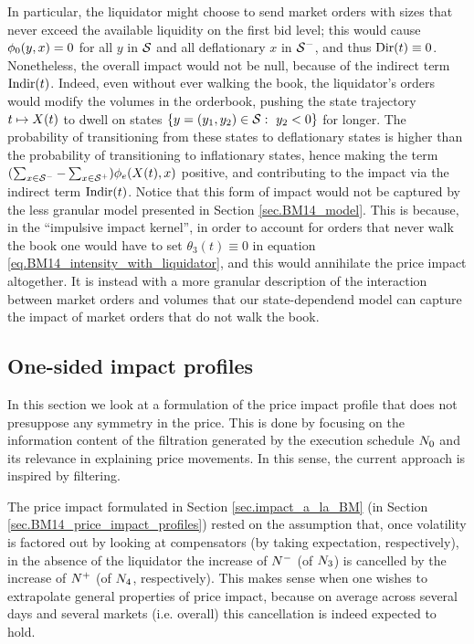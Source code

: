 \documentclass[10pt]{article}
\begin{document}
 In particular, the liquidator might choose to send market orders with sizes that never exceed the available liquidity on the first bid level; this would cause $\transProb_0(y,x)=0$ for all $y$ in $\stateSpace$ and all deflationary $x$ in $\deflationarySpace$, and thus $\directImpact(t)\equiv 0$. Nonetheless, the overall impact would not be null, because of the indirect term $\indirectImpact(t)$. Indeed, even without ever walking the book, the liquidator's orders would modify the volumes in the orderbook, pushing the state trajectory $t\mapsto \stateVariable(t)$ to dwell on states $\lbrace y=(y_1,y_2)\in\stateSpace: \, \, y_2<0\rbrace$ for longer. The probability of transitioning from these states to deflationary states is higher than the probability of transitioning to inflationary states, hence making the term $(\sum_{x\in\deflationarySpace} - \sum_{x\in\inflationarySpace})\transProb_{e}(\stateVariable(t), x)$ positive, and contributing to the impact via the indirect term $\indirectImpact(t)$.
 Notice that this form of impact would not be captured by the less granular model presented in Section \ref{sec.BM14_model}. This is because, in the ``impulsive impact kernel'', in order to account for orders that never walk the book one would have to set $\theta_3(t)\equiv0$ in equation \eqref{eq.BM14_intensity_with_liquidator}, and this would annihilate the price impact altogether.  It is instead with a more granular description of the interaction between market orders and volumes that our state-dependend model can capture the impact of market orders that do not walk the book.   

\subsection{One-sided impact profiles}\label{sec.one-side_impact}
In this section we look at a formulation of the price impact profile that does not presuppose any symmetry in the price. This is done by focusing on the information content of the filtration generated by the execution schedule $\countingProc[0]$ and its relevance in explaining price movements. In this sense, the current approach is inspired by filtering. 

The price impact formulated in Section \ref{sec.impact_a_la_BM} (in Section \ref{sec.BM14_price_impact_profiles}) rested on the assumption that, once volatility is factored out by looking at compensators (by taking expectation, respectively), in the absence of the liquidator the increase of $\Nminus$ (of $\countingProc[3]$) is cancelled by the increase of $\Nplus$ (of $\countingProc[4]$, respectively). This makes sense when one wishes to extrapolate general properties of price impact, because on average across several days and several markets (i.e. overall) this cancellation is indeed expected to hold.
\end{document}
